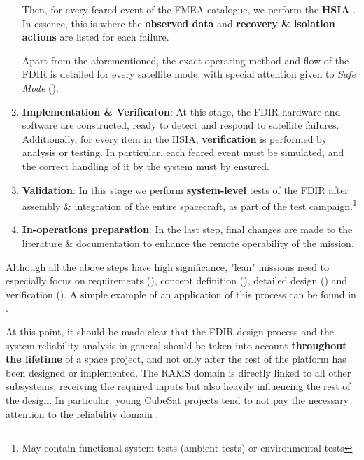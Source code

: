 \documentclass[a4paper,nobib]{tufte-book}
\begin{document}
\begin{enumerate}
	\label{itm:fdir_cdr}
	
	
	Then, for every feared event of the \acs{FMEA} catalogue, we perform the \textbf{\acf{HSIA}} \autocite{ECSS-Q-ST-30-02C}. In essence, this is where the \textbf{observed data} and \textbf{recovery \& isolation actions} are listed for each failure.
	
	Apart from the aforementioned, the exact operating method and flow of the \acs{FDIR} is detailed for every satellite mode, with special attention given to \emph{Safe Mode} ().
	
	\item \textbf{Implementation \& Verificaton}: At this stage, the \acs{FDIR} hardware and software are constructed, ready to detect and respond to satellite failures. Additionally, for every item in the \acs{HSIA}, \textbf{verification} is performed by analysis or testing. In particular, each feared event must be simulated, and the correct handling of it by the system must by ensured.
	\label{itm:fdir_valid}
	
	\item \textbf{Validation}: In this stage we perform \textbf{system-level} tests of the \acs{FDIR} after assembly \& integration of the entire spacecraft, as part of the test campaign.\footnote{May contain functional system tests (ambient tests) or environmental tests}
	
	\item \textbf{In-operations preparation}: In the last step, final changes are made to the literature \& documentation to enhance the remote operability of the mission.
\end{enumerate}

Although all the above steps have high significance, "lean" missions need to especially focus on requirements (), concept definition (), detailed design () and verification (). A simple example of an application of this process can be found in .

At this point, it should be made clear that the \acs{FDIR} design process and the system reliability analysis in general should be taken into account \textbf{throughout the lifetime} of a space project, and not only after the rest of the platform has been designed or implemented. The \ac{RAMS} domain is directly linked to all other subsystems, receiving the required inputs but also heavily influencing the rest of the design. In particular, young CubeSat projects tend to not pay the necessary attention to the reliability domain \autocite{langer_reliability_estimation_2017}.
\end{document}
